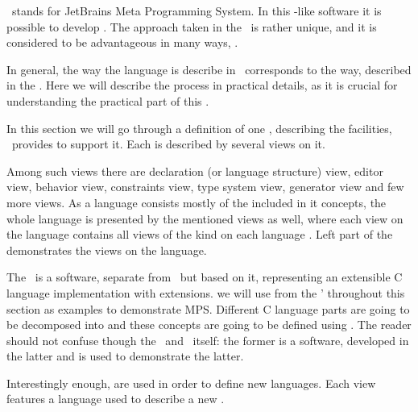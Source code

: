 
\jbmps\ stands for JetBrains Meta Programming System. In this -like software it is possible to develop .
The approach taken in the \jbmps\ is rather unique, and it is considered to be advantageous in many ways, \cite{Voelter:MoDELS:2010}.


In general, the way the language is describe in \jbmps\ corresponds to the way, described in the .
Here we will describe the process in practical details, as it is crucial for understanding the practical part of this \MT.

In this section we will go through a definition of one , describing the facilities, \jbmps\ provides to support
it. Each  is described by several views on it. 


Among such views there are  declaration (or language structure) view, editor view, behavior view, constraints view, type system view,
generator view and few more views. As a language consists mostly of the included in it concepts, 
the whole language is presented by the mentioned views as well, where each view on the language contains all views of the kind on each language . 
Left part of the  demonstrates the views on the  language.


The \mbp\ is a software, separate from \jbmps\, but based on it, representing an extensible C language implementation with extensions.
we will use  from the \mbp' throughout this section as examples to demonstrate MPS. Different C language parts are going to be 
decomposed into  and these concepts are going to be defined using \jbmps. The reader should not confuse though the \mbp\ and 
\jbmps\ itself: the former is a software, developed in the latter and is used to demonstrate the latter.

Interestingly enough,  are used in order to define new languages. Each view features a language used to describe a new .

